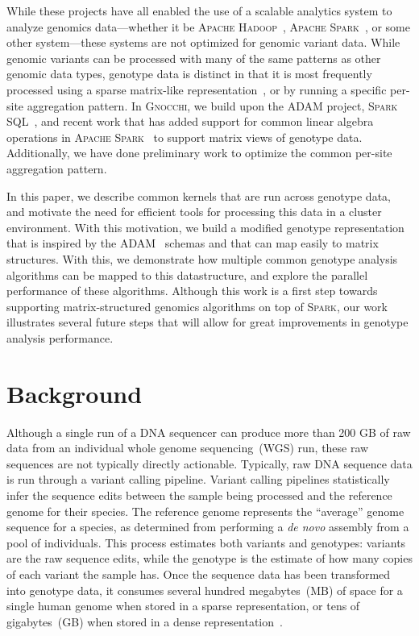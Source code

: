 \documentclass[11pt]{article} %
\begin{document}
While these projects have all enabled the use of a scalable analytics system
to analyze genomics data---whether it be \textsc{Apache Hadoop}~\cite{hadoop},
\textsc{Apache Spark}~\cite{zaharia12, zaharia10}, or some other system---these
systems are not optimized for genomic variant data. While genomic variants can
be processed with many of the same patterns as other genomic data types,
genotype data is distinct in that it is most frequently processed using a sparse
matrix-like representation~\cite{layer15, taft14}, or by running a specific
per-site aggregation pattern. In \textsc{Gnocchi}, we build upon the
\textsc{ADAM} project, \textsc{Spark SQL}~\cite{armbrust15}, and recent work
that has added support for common linear algebra operations in \textsc{Apache
Spark}~\cite{zadeh15} to support matrix views of genotype data. Additionally,
we have done preliminary work to optimize the common per-site aggregation
pattern.

In this paper, we describe common kernels that are run across genotype data,
and motivate the need for efficient tools for processing this data in a cluster
environment. With this motivation, we build a modified genotype representation
that is inspired by the \textsc{ADAM}~\cite{nothaft15} schemas and that can map
easily to matrix structures. With this, we demonstrate how multiple common
genotype analysis algorithms can be mapped to this datastructure, and explore
the parallel performance of these algorithms. Although this work is a first
step towards supporting matrix-structured genomics algorithms on top of
\textsc{Spark}, our work illustrates several future steps that will allow for
great improvements in genotype analysis performance.

\section{Background}
\label{sec:background}

Although a single run of a DNA sequencer can produce more than 200 GB of raw
data from an individual whole genome sequencing~(WGS) run, these raw sequences
are not typically directly actionable. Typically, raw DNA sequence data is run
through a variant calling pipeline. Variant calling pipelines statistically
infer the sequence edits between the sample being processed and the reference
genome for their species.  The reference genome represents the ``average'' genome
sequence for a species, as determined from performing a \emph{de novo} assembly
from a pool of individuals. This process estimates both variants and genotypes:
variants are the raw sequence edits, while the genotype is the estimate of how
many copies of each variant the sample has. Once the sequence data has been
transformed into genotype data, it consumes several hundred megabytes~(MB) of
space for a single human genome when stored in a sparse representation, or tens
of gigabytes~(GB) when stored in a dense representation~\cite{danecek11}.
\end{document}
